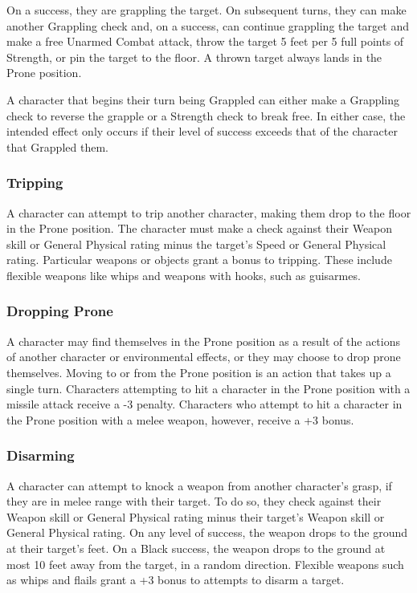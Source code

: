 \documentclass[oneside]{book}
\begin{document}
\begin{multicols}{2}
On a success, they are grappling the target. On subsequent turns, they can make another Grappling check and, on a success, can continue grappling the target and make a free Unarmed Combat attack, throw the target 5 feet per 5 full points of Strength, or pin the target to the floor. A thrown target always lands in the Prone position.

A character that begins their turn being Grappled can either make a Grappling check to reverse the grapple or a Strength check to break free. In either case, the intended effect only occurs if their level of success exceeds that of the character that Grappled them. 

\subsubsection{Tripping}
A character can attempt to trip another character, making them drop to the floor in the Prone position. The character must make a check against their Weapon skill or General Physical rating minus the target's Speed or General Physical rating. Particular weapons or objects grant a bonus to tripping. These include flexible weapons like whips and weapons with hooks, such as guisarmes.

\subsubsection{Dropping Prone}
A character may find themselves in the Prone position as a result of the actions of another character or environmental effects, or they may choose to drop prone themselves. Moving to or from the Prone position is an action that takes up a single turn. Characters attempting to hit a character in the Prone position with a missile attack receive a -3 penalty. Characters who attempt to hit a character in the Prone position with a melee weapon, however, receive a +3 bonus. 

\subsubsection{Disarming}
A character can attempt to knock a weapon from another character's grasp, if they are in melee range with their target. To do so, they check against their Weapon skill or General Physical rating minus their target's Weapon skill or General Physical rating. On any level of success, the weapon drops to the ground at their target's feet. On a Black success, the weapon drops to the ground at most 10 feet away from the target, in a random direction. Flexible weapons such as whips and flails grant a +3 bonus to attempts to disarm a target.


\end{multicols}
\end{document}
